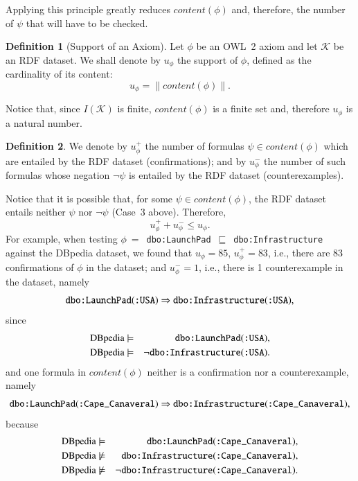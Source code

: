 \documentclass[review]{elsarticle}
\theoremstyle{definition}
\newtheorem{definition}{Definition}
\begin{document}
Applying this principle greatly reduces $content(\phi)$ and, therefore,
the number of $\psi$ that will have to be checked.

\begin{definition}[Support of an Axiom]\label{def:support}
  Let $\phi$ be an OWL~2 axiom and let $\mathcal{K}$ be an RDF dataset.
  We shall denote by $u_\phi$ the support of $\phi$, defined as the cardinality
  of its content:
  \[
    u_\phi = \|content(\phi)\|.
  \]
\end{definition}

Notice that, since $I(\mathcal{K})$ is finite, $content(\phi)$ is a finite
set and, therefore $u_\phi$ is a natural number.




\begin{definition}
  We denote by $u_\phi^+$ the number of formulas $\psi \in content(\phi)$
  which are entailed by the RDF dataset (confirmations);
  and by $u_\phi^-$ the number of such formulas
  whose negation $\neg\psi$ is entailed by the RDF dataset (counterexamples).
\end{definition}

Notice that it is possible that, for some $\psi \in content(\phi)$,
the RDF dataset entails neither $\psi$ nor $\neg\psi$ (Case~3 above). Therefore,
\begin{equation}
  u_\phi^+ + u_\phi^- \leq u_\phi.\label{eq:conf-pls-expt-lt-refc}
\end{equation}
For example, when testing
$\phi~=$~\texttt{dbo:LaunchPad}~$\sqsubseteq$~\texttt{dbo:Infrastructure} against the DBpedia dataset,
we found that $u_\phi = 85$,
$u_\phi^+ = 83$, i.e., there are 83 confirmations of $\phi$ in the dataset; 
and $u_\phi^- = 1$, i.e., there is 1 counterexample in the dataset, namely
\[
  \mbox{\tt dbo:LaunchPad}(\mbox{\tt :USA}) \Rightarrow
  \mbox{\tt dbo:Infrastructure}(\mbox{\tt :USA}),
\]
since
\begin{eqnarray*}
  \mbox{DBpedia} &\models& \mbox{\tt dbo:LaunchPad}(\mbox{\tt :USA}),\\
  \mbox{DBpedia} &\models& \neg\mbox{\tt dbo:Infrastructure}(\mbox{\tt :USA}).
\end{eqnarray*}
and one formula in $content(\phi)$ neither is a confirmation nor a counterexample, namely
\[
  \mbox{\tt dbo:LaunchPad}(\mbox{\tt :Cape\_Canaveral}) \Rightarrow
  \mbox{\tt dbo:Infrastructure}(\mbox{\tt :Cape\_Canaveral}),
\]
because
\begin{eqnarray*}
  \mbox{DBpedia} &\models& \mbox{\tt dbo:LaunchPad}(\mbox{\tt :Cape\_Canaveral}),\\
  \mbox{DBpedia} &\not\models& \mbox{\tt dbo:Infrastructure}(\mbox{\tt :Cape\_Canaveral}),\\
  \mbox{DBpedia} &\not\models& \neg\mbox{\tt dbo:Infrastructure}(\mbox{\tt :Cape\_Canaveral}).
\end{eqnarray*}
\end{document}
